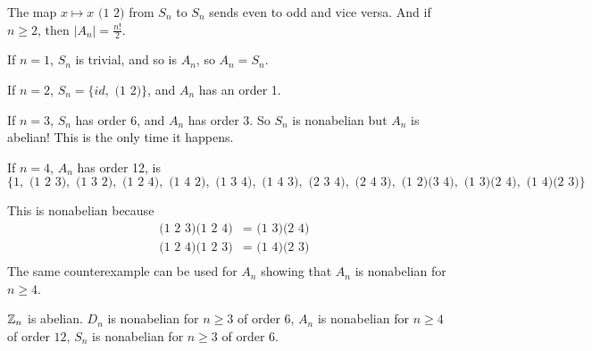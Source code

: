\documentclass[class=article,crop=false]{standalone}
\begin{document}
\begin{prf}
	The map $ x \mapsto x \text{ (1 2)} $ from $ S_n$ to $ S_n$ sends even to odd and vice versa.
	And if $ n\geq 2$, then  $ |A_n|=\frac{n!}{2}$.
\end{prf}
\begin{note}[]
If $ n=1$,  $ S_n$ is trivial, and so is $ A_n$, so $ A_n=S_n$.

If $ n=2$,  $ S_n = \{id, \text{ (1 2)} \} $, and $ A_n$ has an order 1.

If $ n=3$,  $ S_n$ has order 6, and $ A_n$ has order 3. So $ S_n$ is nonabelian but $ A_n$ is abelian! This is the only time it happens.

If $ n=4$,  $ A_n$ has order 12, is $ \{1, \text{ (1 2 3)}, \text{ (1 3 2)}, \text{ (1 2 4)}, \text{ (1 4 2)}, \text{ (1 3 4)}, \text{ (1 4 3)}, \text{ (2 3 4)}, \text{ (2 4 3)}, \text{ (1 2)(3 4)}, \text{ (1 3)(2 4)}, \text{ (1 4)(2 3)}        \} $

This is nonabelian because
\begin{align*}
	\text{ (1 2 3)(1 2 4)} &= \text{ (1 3)(2 4)}  \\
	\text{ (1 2 4)(1 2 3)} &= \text{ (1 4)(2 3)}  \\ 
\end{align*}
The same counterexample can be used for $ A_n$ showing that $ A_n$ is nonabelian for $ n \geq 4$.
\end{note}

\begin{note}[]
$ \mathbb{Z}_n$ is abelian. $ D_n$ is nonabelian for $ n\geq 3$ of  order 6, $ A_n$ is nonabelian for $ n\geq 4$ of order $ 12$, $ S_n$ is nonabelian for $ n\geq 3$ of order  $ 6$.
\end{note}
\end{document}
